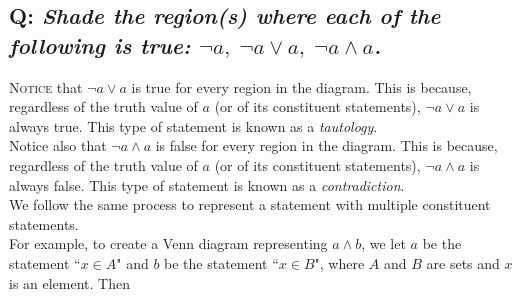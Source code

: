 \documentclass{article}
\begin{document}
\subsection*{Q: {\em Shade the region(s) where each of the following is true: $\neg a,\;\neg a\vee a,\;\neg a\wedge a$.}}
\begin{center}
\qquad
{}\qquad
{}
\end{center}
\textsc{Notice} that $\neg a\vee a$ is true for every region in the diagram. This is because, regardless of the truth value of $a$ (or of its constituent statements), $\neg a\vee a$ is always true. This type of statement is known as a \textit{tautology}.\\[1ex]
Notice also that $\neg a\wedge a$ is false for every region in the diagram. This is because, regardless of the truth value of $a$ (or of its constituent statements), $\neg a\wedge a$ is always false. This type of statement is known as a \textit{contradiction}.\\[1em]
We follow the same process to represent a statement with multiple constituent statements.\\
For example, to create a Venn diagram representing $a\wedge b$, we let $a$ be the statement ``$x\in A$" and $b$ be the statement ``$x\in B$", where $A$ and $B$ are sets and $x$ is an element. Then
\end{document}
